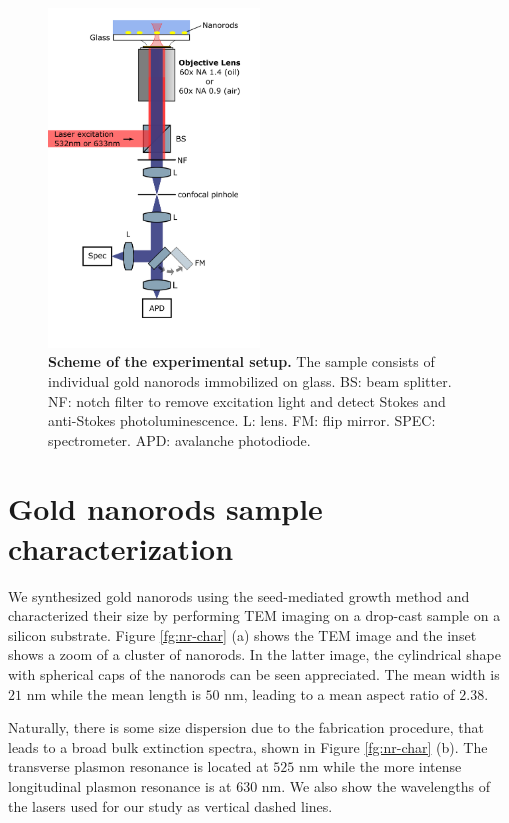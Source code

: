 \documentclass[journal=nalefd,manuscript=letter]{achemso}
\begin{document}
\begin{figure}[htp] \centering
\includegraphics[width=0.5\textwidth]{Figures/Supplementary/02_Setup/setup.png}
\caption{\textbf{Scheme of the experimental setup.} The sample consists of individual gold nanorods immobilized on glass. BS: beam splitter. NF: notch filter to remove excitation light and detect Stokes and anti-Stokes photoluminescence. L: lens. FM: flip mirror. SPEC: spectrometer. APD: avalanche photodiode.}
	\label{fig:setup}
\end{figure}

\pagebreak

\section{Gold nanorods sample characterization}

We synthesized gold nanorods using the seed-mediated growth method \cite{nikoobakht2003preparation} 
and characterized their size by performing TEM imaging on a drop-cast sample on a silicon substrate. 
Figure \ref{fg:nr-char} (a) shows the TEM image and the inset shows a zoom of a cluster of nanorods.
In the latter image, the cylindrical shape with spherical caps of the nanorods can be seen appreciated. 
The mean width is $21$ nm while the mean length is $50$ nm, leading to a mean aspect ratio of $2.38$. 

Naturally, there is some size dispersion due to the fabrication procedure, that leads to a broad bulk extinction 
spectra, shown in Figure \ref{fg:nr-char} (b). The transverse plasmon resonance is located at 
$525$ nm while the more intense longitudinal plasmon resonance is at $630$ nm. We also show 
the wavelengths of the lasers used for our study as vertical dashed lines. 
\end{document}
